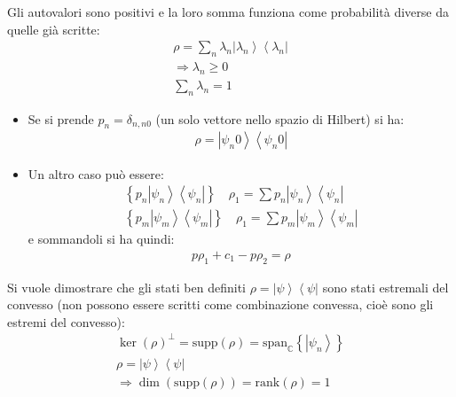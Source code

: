 Gli autovalori sono positivi e la loro somma funziona come probabilità diverse da quelle già scritte:
\begin{equation}\begin{split}
\rho=\sum_n{\lambda_n\left |\lambda_n \right\rangle\left\langle \lambda_n\right |} \\
\Longrightarrow \lambda _n\ge 0 \\
\sum_n{\lambda_n}=1
\end{split}\end{equation}

\begin{itemize}
\item Se si prende $p_n=\delta_{n,n0}$ (un solo vettore nello spazio di Hilbert) si ha:
\begin{equation}\begin{split}
\rho=\left |\psi _n0 \right\rangle\left\langle \psi _n0\right |
\end{split}\end{equation}

\item Un altro caso può essere:
\begin{equation}\begin{split}
\left\{p_n\left |\psi _n \right\rangle\left\langle \psi _n\right |\right\} \quad \rho_1=\sum{p_n\left |\psi _n \right\rangle\left\langle \psi _n\right |} \\
\left\{p_m\left |\psi _m \right\rangle\left\langle \psi _m\right |\right\} \quad \rho_1=\sum{p_m\left |\psi _m \right\rangle\left\langle \psi _m\right |}
\end{split}\end{equation}
e sommandoli si ha quindi:
\begin{equation}\begin{split}
p\rho_1+c_1-p\rho_2=\rho
\end{split}\end{equation}


\end{itemize}

Si vuole dimostrare che gli stati ben definiti $\rho=\left |\psi  \right\rangle\left\langle \psi \right |$ sono stati estremali del convesso (non possono essere scritti come combinazione convessa, cioè sono gli estremi del convesso):
\begin{equation}\begin{split}
\ker{\left(\rho\right)^{\perp}}=\textrm{supp}\left(\rho\right)=\textrm{span}_\mathbb{C} \left\{\left |\psi _n \right\rangle\right\} \\
\rho=\left |\psi  \right\rangle\left\langle \psi \right | \\
\Longrightarrow \dim{\left(\textrm{supp}\left(\rho\right)\right)}=\textrm{rank}\left(\rho\right)=1
\end{split}\end{equation}


